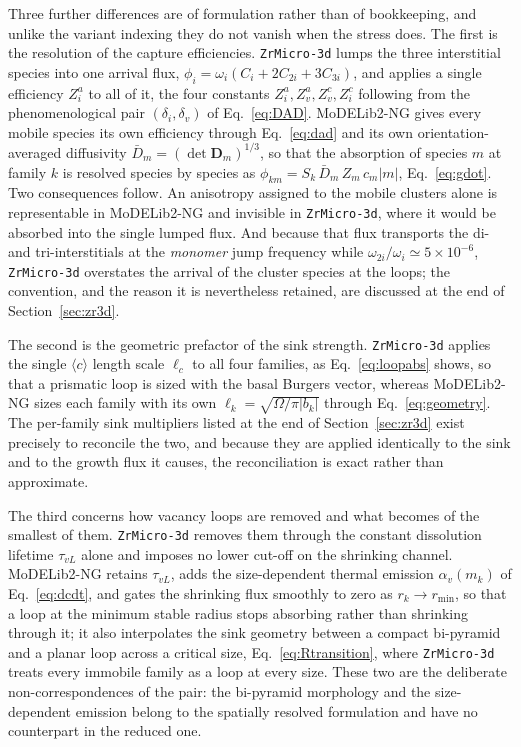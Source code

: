 \documentclass{article}
\newcommand{\cloop}{\ensuremath{\langle c\rangle}}
\newcommand{\ZrM}{\texttt{ZrMicro-3d}}
\newcommand{\MoDNG}{\textsf{MoDELib2-NG}}
\begin{document}
Three further differences are of formulation rather than of bookkeeping, and
unlike the variant indexing they do not vanish when the stress does. The first is
the resolution of the capture efficiencies. {\ZrM} lumps the three interstitial
species into one arrival flux, $\phi_i=\omega_i(C_i+2C_{2i}+3C_{3i})$, and applies
a single efficiency $Z^{a}_i$ to all of it, the four constants
$Z^{a}_i,Z^{a}_v,Z^{c}_v,Z^{c}_i$ following from the phenomenological pair
$(\delta_i,\delta_v)$ of Eq.~\eqref{eq:DAD}. {\MoDNG} gives every mobile species
its own efficiency through Eq.~\eqref{eq:dad} and its own orientation-averaged
diffusivity $\bar D_m=(\det\bm D_m)^{1/3}$, so that the absorption of species $m$
at family $k$ is resolved species by species as
$\phi_{km}=S_k\,\bar D_m\,Z_m\,c_m|m|$, Eq.~\eqref{eq:gdot}. Two consequences
follow. An anisotropy assigned to the mobile clusters alone is representable in
{\MoDNG} and invisible in {\ZrM}, where it would be absorbed into the single
lumped flux. And because that flux transports the di- and tri-interstitials at the
\emph{monomer} jump frequency while $\omega_{2i}/\omega_i\simeq5\times10^{-6}$,
{\ZrM} overstates the arrival of the cluster species at the loops; the convention,
and the reason it is nevertheless retained, are discussed at the end of
Section~\ref{sec:zr3d}.

The second is the geometric prefactor of the sink strength. {\ZrM} applies the
single \cloop{} length scale $\ell_c$ to all four families, as
Eq.~\eqref{eq:loopabs} shows, so that a prismatic loop is sized with the basal
Burgers vector, whereas {\MoDNG} sizes each family with its own
$\ell_k=\sqrt{\Omega/\pi|b_k|}$ through Eq.~\eqref{eq:geometry}. The per-family
sink multipliers listed at the end of Section~\ref{sec:zr3d} exist precisely to
reconcile the two, and because they are applied identically to the sink and to the
growth flux it causes, the reconciliation is exact rather than approximate.

The third concerns how vacancy loops are removed and what becomes of the smallest
of them. {\ZrM} removes them through the constant dissolution lifetime $\tau_{vL}$
alone and imposes no lower cut-off on the shrinking channel. {\MoDNG} retains
$\tau_{vL}$, adds the size-dependent thermal emission $\alpha_v(m_k)$ of
Eq.~\eqref{eq:dcdt}, and gates the shrinking flux smoothly to zero as
$r_k\to r_{\min}$, so that a loop at the minimum stable radius stops absorbing
rather than shrinking through it; it also interpolates the sink geometry between a
compact bi-pyramid and a planar loop across a critical size,
Eq.~\eqref{eq:Rtransition}, where {\ZrM} treats every immobile family as a loop at
every size. These two are the deliberate non-correspondences of the pair: the
bi-pyramid morphology and the size-dependent emission belong to the spatially
resolved formulation and have no counterpart in the reduced one.
\end{document}
